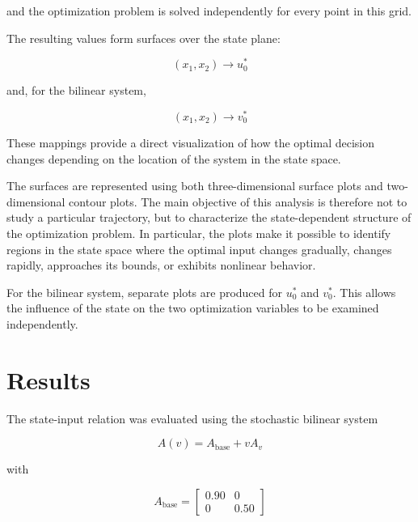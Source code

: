 and the optimization problem is solved independently for every point in this
grid.

The resulting values form surfaces over the state plane:

\begin{equation}
    (x_1,x_2)
    \longrightarrow
    u_0^\ast
\end{equation}

and, for the bilinear system,

\begin{equation}
    (x_1,x_2)
    \longrightarrow
    v_0^\ast
\end{equation}

These mappings provide a direct visualization of how the optimal decision
changes depending on the location of the system in the state space.

The surfaces are represented using both three-dimensional surface plots and
two-dimensional contour plots. The main objective of this analysis is therefore not to study a particular
trajectory, but to characterize the state-dependent structure of the
optimization problem. In particular, the plots make it possible to identify
regions in the state space where the optimal input changes gradually, changes
rapidly, approaches its bounds, or exhibits nonlinear behavior.

For the bilinear system, separate plots are produced for \(u_0^\ast\) and
\(v_0^\ast\). This allows the influence of the state on the two optimization
variables to be examined independently.


\section{Results}
\label{sec:state_input_results}

The state-input relation was evaluated using the stochastic bilinear system

\begin{equation}
    A(v)
    =
    A_{\mathrm{base}}
    +
    vA_v
\end{equation}

with

\begin{equation}
    A_{\mathrm{base}}
    =
    \begin{bmatrix}
        0.90 & 0 \\
        0 & 0.50
    \end{bmatrix}
\end{equation}

